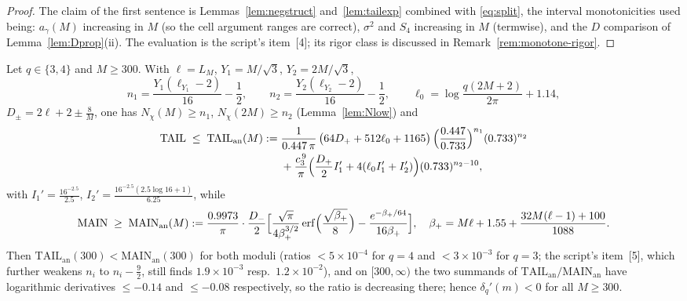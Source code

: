 \begin{proof}
The claim of the first sentence is
Lemmas~\ref{lem:negstruct} and~\ref{lem:tailexp} combined with
\eqref{eq:split}, the interval monotonicities used being: $a_\gamma(M)$
increasing in $M$ (so the cell argument ranges are correct),
$\sigma^2$ and $S_4$ increasing in $M$ (termwise), and the $D$
comparison of Lemma~\ref{lem:Dprop}(ii). The evaluation is the
script's item~[4]; its rigor class is discussed in
Remark~\ref{rem:monotone-rigor}.
\end{proof}

\begin{lemma}
\label{lem:analytic-leg}
Let $q\in\{3,4\}$ and $M\ge300$. With $\ell=L_M$,
$Y_1=M/\sqrt3$, $Y_2=2M/\sqrt3$,
\[
n_1=\frac{Y_1(\ell_{Y_1}-2)}{16}-\frac12,\qquad
n_2=\frac{Y_2(\ell_{Y_2}-2)}{16}-\frac12,\qquad
\ell_0=\log\frac{q(2M+2)}{2\pi}+1.14,
\]
$D_{\pm}=2\ell+2\pm\tfrac8M$, one has $N_\chi(M)\ge n_1$,
$N_\chi(2M)\ge n_2$ (Lemma~\ref{lem:Nlow}) and
\begin{align*}
\mathrm{TAIL}\;\le\;\mathrm{TAIL}_{\mathrm{an}}(M)
:=\;&\frac{1}{0.447\,\pi}\,
\bigl(64D_++512\ell_0+1165\bigr)\,
\Bigl(\frac{0.447}{0.733}\Bigr)^{n_1}(0.733)^{n_2}\\
&+\frac{c_3^{\,9}}\pi\Bigl(\frac{D_+}2I_1'+4(\ell_0I_1'+I_2')\Bigr)
(0.733)^{n_2-10},
\end{align*}
with $I_1'=\tfrac{16^{-2.5}}{2.5}$,
$I_2'=\tfrac{16^{-2.5}(2.5\log16+1)}{6.25}$, while
\[
\mathrm{MAIN}\;\ge\;\mathrm{MAIN}_{\mathrm{an}}(M)
:=\frac{0.9973}\pi\cdot\frac{D_-}2
\Bigl[\frac{\sqrt\pi}{4\beta_+^{3/2}}
\operatorname{erf}\Bigl(\frac{\sqrt{\beta_+}}8\Bigr)
-\frac{e^{-\beta_+/64}}{16\beta_+}\Bigr],
\quad
\beta_+=M\ell+1.55+\frac{32M(\ell-1)+100}{1088}.
\]
Then $\mathrm{TAIL}_{\mathrm{an}}(300)<
\mathrm{MAIN}_{\mathrm{an}}(300)$ for both moduli (ratios
$<5\times10^{-4}$ for $q=4$ and $<3\times10^{-3}$ for $q=3$; the
script's item~[5], which further weakens $n_i$ to $n_i-\tfrac92$,
still finds $1.9\times10^{-3}$ resp.\ $1.2\times10^{-2}$), and on
$[300,\infty)$ the two summands of
$\mathrm{TAIL}_{\mathrm{an}}/\mathrm{MAIN}_{\mathrm{an}}$ have
logarithmic derivatives $\le-0.14$ and $\le-0.08$ respectively, so
the ratio is decreasing there; hence
$\delta_q'(m)<0$ for all $M\ge300$.
\end{lemma}

